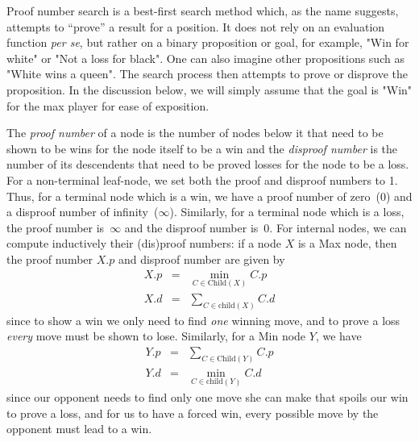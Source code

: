 \documentclass[10pt,dvipdfmx]{report}
\begin{document}
Proof number search is a best-first search method which, as the name suggests, attempts
to ``prove'' a result for a position.  It does not rely on an evaluation function {\it per se},
but rather on a binary proposition or goal, for example, "Win for white" or "Not a loss for black".
One can also imagine other propositions such as "White wins a queen".
The search process then attempts to prove or disprove the proposition.
In the discussion below, we will simply assume that the goal is "Win" for the max player for
ease of exposition.

The {\it proof number} of a node is the number of nodes below it that need to
be shown to be wins for the node itself to be a win and the {\it disproof number}
is the number of its descendents that need to be proved losses for the node to be a loss.
For a non-terminal leaf-node, we set both the proof and disproof numbers to 1.
Thus, for a terminal node which is a win, we have a proof number of zero~($0$) and a disproof number of infinity~($\infty$).
Similarly, for a terminal node which is a loss, the proof number is~$\infty$ and the disproof number is~$0$.
For internal nodes, we can compute inductively their (dis)proof numbers: if a node $X$ is a Max node,
then the proof number $X.p$ and disproof number are given by
\begin{eqnarray*}
X.p &=& \min_{C\in\text{Child}(X)} C.p \\
X.d &=& \sum_{C\in\text{child}(X)} C.d
\end{eqnarray*}
since to show a win we only need to find {\em one} winning move,
and to prove a loss {\em every} move must be shown to lose.
Similarly, for a Min node $Y$, we have
\begin{eqnarray*}
Y.p &=& \sum_{C\in\text{Child}(Y)} C.p \\
Y.d &=& \min_{C\in\text{child}(Y)} C.d
\end{eqnarray*}
since our opponent needs to find only one move she can make that spoils our win to prove a loss,
and for us to have a forced win, every possible move by the opponent must lead to a win.
\end{document}
